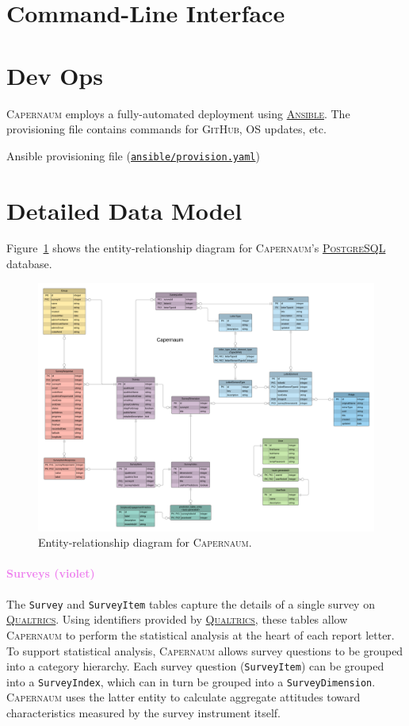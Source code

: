 \documentclass{article}
\newcommand{\ghtag}{9f6bf064539bf10283353d70d2495de02675d815}
\newcommand{\ghurl}{https://github.com/quantum-bits/capernaum/blob/\ghtag}
\newcommand{\ghsrc}[2]{
  \begin{tcolorbox}
    #1 (\href{\ghurl/#2}{\texttt{#2}})
  \end{tcolorbox}
}
\newcommand{\caper}{\textsc{Capernaum}}
\newcommand{\gh}{\textsc{GitHub}}
\newcommand{\ansible}{\href{https://www.ansible.com/}{\textsc{Ansible}}}
\newcommand{\pg}{\href{https://www.postgresql.org/}{\textsc{PostgreSQL}}}
\newcommand{\qual}{\href{https://www.qualtrics.com/}{\textsc{Qualtrics}}}
\begin{document}
\section{Command-Line Interface}
\label{sec:cli}

\section{Dev Ops}
\label{sec:deployment}

\caper{} employs a fully-automated deployment
using \ansible.
The provisioning file contains commands for \gh{}, OS updates, etc.
\ghsrc{Ansible provisioning file}{ansible/provision.yaml}

\appendix

\section{Detailed Data Model}
\label{sec:detailed-data-model}

Figure~\ref{fig:erd} shows the entity-relationship diagram for \caper's \pg{} database.
\begin{figure}
  \centering
  \includegraphics[width=\textwidth]{data-model}
  \caption{Entity-relationship diagram for \caper.}
  \label{fig:erd}
\end{figure}

\paragraph{\textcolor{Violet}{Surveys (violet)}}

The \texttt{Survey} and \texttt{SurveyItem} tables
capture the details of a single survey on \qual.
Using identifiers provided by \qual,
these tables allow \caper{} to perform the statistical analysis at the heart of each report letter.
To support statistical analysis,
\caper{} allows survey questions to be grouped into a category hierarchy.
Each survey question (\texttt{SurveyItem})
can be grouped into a \texttt{SurveyIndex},
which can in turn be grouped into a \texttt{SurveyDimension}.
\caper{} uses the latter entity to calculate aggregate attitudes
toward characteristics measured by the survey instrument itself.
\end{document}
